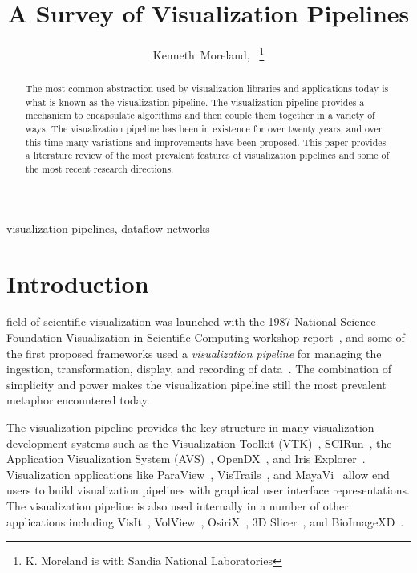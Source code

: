 \documentclass[journal,onecolumn,12pt,letterpaper,twoside]{IEEEtran}
\title{A Survey of Visualization Pipelines}
\author{Kenneth~Moreland,~\IEEEmembership{Member,~IEEE}%
%
\thanks{K. Moreland is with Sandia National Laboratories}
}
\date{}
\newcommand*{\lcite}[1]{~\cite{#1}}
\newcommand*{\keyterm}[1]{\emph{#1}}
\begin{document}
\maketitle


\begin{abstract}
The most common abstraction used by visualization libraries and
applications today is what is known as the visualization pipeline.  The
visualization pipeline provides a mechanism to encapsulate algorithms and
then couple them together in a variety of ways.  The visualization pipeline
has been in existence for over twenty years, and over this time many
variations and improvements have been proposed.  This paper provides a
literature review of the most prevalent features of visualization pipelines
and some of the most recent research directions.
\end{abstract}

\begin{keywords}
  visualization pipelines, dataflow networks
\end{keywords}


\section{Introduction}
\label{sec:Introduction}

 field of scientific visualization was launched with the 1987 National
Science Foundation Visualization in Scientific Computing workshop
report\lcite{ViSC1987}, and some of the first proposed frameworks used a
\keyterm{visualization pipeline} for managing the ingestion,
transformation, display, and recording of
data\lcite{Haeberli1988,Lucas1992}.  The combination of simplicity and
power makes the visualization pipeline still the most prevalent metaphor
encountered today.

The visualization pipeline provides the key
structure in many visualization development systems such as the
Visualization Toolkit (VTK)\lcite{VTK}, SCIRun\lcite{SCIRun}, the
Application Visualization System (AVS)\lcite{AVS}, OpenDX\lcite{OpenDX},
and Iris Explorer\lcite{IRISExplorer}.  Visualization applications like
ParaView\lcite{ParaView}, VisTrails\lcite{VisTrails}, and
MayaVi\lcite{MayaVi} allow end users to build visualization pipelines with
graphical user interface representations.  The visualization pipeline is
also used internally in a number of other applications including
VisIt\lcite{VisIt}, VolView\lcite{VolView}, OsiriX\lcite{OsiriX}, 3D
Slicer\lcite{3DSlicer}, and BioImageXD\lcite{BioImageXD}.
\end{document}
